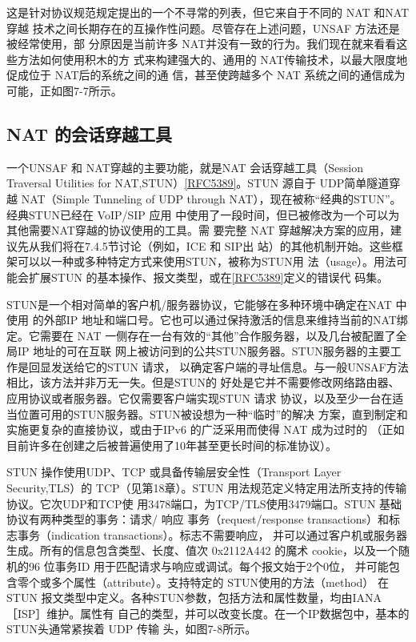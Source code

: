 这是针对协议规范规定提出的一个不寻常的列表，但它来自于不同的 NAT 和NAT 穿越
技术之间长期存在的互操作性问题。尽管存在上述问题，UNSAF 方法还是被经常使用，部
分原因是当前许多 NAT并没有一致的行为。我们现在就来看看这些方法如何使用积木的方
式来构建强大的、通用的 NAT传输技术，以最大限度地促成位于 NAT后的系统之间的通
信，甚至使跨越多个 NAT 系统之间的通信成为可能，正如图7-7所示。

\subsection{NAT 的会话穿越工具}

一个UNSAF 和 NAT穿越的主要功能，就是NAT 会话穿越工具（Session Traversal
Utilities for NAT,STUN）\href{https://www.rfc-editor.org/rfc/rfc5389}{[RFC5389]}。STUN 源自于 UDP简单隧道穿越 NAT（Simple Tunneling
of UDP through NAT），现在被称“经典的STUN”。经典STUN已经在 VoIP/SIP 应用
中使用了一段时间，但已被修改为一个可以为其他需要NAT穿越的协议使用的工具。需
要完整 NAT 穿越解决方案的应用，建议先从我们将在7.4.5节讨论（例如，ICE 和 SIP出
站）的其他机制开始。这些框架可以以一种或多种特定方式来使用STUN，被称为STUN用
法（usage）。用法可能会扩展STUN 的基本操作、报文类型，或在\href{https://www.rfc-editor.org/rfc/rfc5389}{[RFC5389]}定义的错误代
码集。

STUN是一个相对简单的客户机/服务器协议，它能够在多种环境中确定在NAT 中使用
的外部IP 地址和端口号。它也可以通过保持激活的信息来维持当前的NAT绑定。它需要在
NAT 一侧存在一台有效的“其他”合作服务器，以及几台被配置了全局IP 地址的可在互联
网上被访问到的公共STUN服务器。STUN服务器的主要工作是回显发送给它的STUN 请求，
以确定客户端的寻址信息。与一般UNSAF方法相比，该方法并非万无一失。但是STUN的
好处是它并不需要修改网络路由器、应用协议或者服务器。它仅需要客户端实现STUN 请求
协议，以及至少一台在适当位置可用的STUN服务器。STUN被设想为一种“临时”的解决
方案，直到制定和实施更复杂的直接协议，或由于IPv6 的广泛采用而使得 NAT 成为过时的
（正如目前许多在创建之后被普遍使用了10年甚至更长时间的标准协议）。

STUN 操作使用UDP、TCP 或具备传输层安全性（Transport Layer Security,TLS）的
TCP（见第18章）。STUN 用法规范定义特定用法所支持的传输协议。它次UDP和TCP使
用3478端口，为TCP/TLS使用3479端口。STUN 基础协议有两种类型的事务：请求/ 响应
事务（request/response transactions）和标志事务（indication transactions）。标志不需要响应，
并可以通过客户机或服务器生成。所有的信息包含类型、长度、值次 0x2112A442 的魔术
cookie，以及一个随机的96 位事务ID 用于匹配请求与响应或调试。每个报文始于2个0位，
并可能包含零个或多个属性（attribute）。支持特定的 STUN使用的方法（method） 在 STUN
报文类型中定义。各种STUN参数，包括方法和属性数量，均由IANA［ISP］维护。属性有
自己的类型，并可以改变长度。在一个IP数据包中，基本的STUN头通常紧挨着 UDP 传输
头，如图7-8所示。

